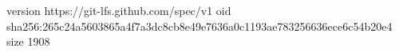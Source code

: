 version https://git-lfs.github.com/spec/v1
oid sha256:265c24a5603865a4f7a3dc8cb8e49e7636a0c1193ae783256636ece6c54b20e4
size 1908
